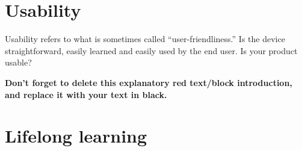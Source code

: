 \section{Usability} %

\begin{tcolorbox}[      %
    boxrule=0pt,        %
    colback=white,      %
    coltext=red         %
]                       %
    Usability refers to what is sometimes called “user-friendliness.” Is the device straightforward, easily learned and easily used by the end user. Is your product usable?
    
    \vspace{15pt}       %
    \begin{center}      %
    \textbf{Don't forget to delete this explanatory red text/block introduction, and replace it with your text in black.}
    \end{center}        %
\end{tcolorbox}         %

\section{Lifelong learning} %

